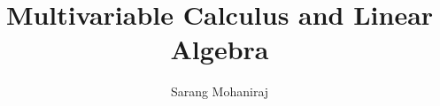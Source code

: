 \title{Multivariable Calculus and Linear Algebra}
\author{Sarang Mohaniraj}

\maketitle
\newpage

\tableofcontents
